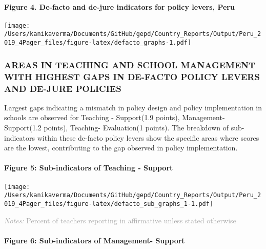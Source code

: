 \documentclass[
  twocolumn]{article}
\begin{document}
\hypertarget{figure-4.-de-facto-and-de-jure-indicators-for-policy-levers-peru}{%
\paragraph{Figure 4. De-facto and de-jure indicators for policy levers,
Peru}\label{figure-4.-de-facto-and-de-jure-indicators-for-policy-levers-peru}}

\texttt{[image: /Users/kanikaverma/Documents/GitHub/gepd/Country\_Reports/Output/Peru\_2019\_4Pager\_files/figure-latex/defacto\_graphs-1.pdf]}

\hypertarget{areas-in-teaching-and-school-management-with-highest-gaps-in-de-facto-policy-levers-and-de-jure-policies}{%
\subsubsection{\texorpdfstring{\textbf{AREAS IN TEACHING AND SCHOOL
MANAGEMENT WITH HIGHEST GAPS IN DE-FACTO POLICY LEVERS AND DE-JURE
POLICIES}}{AREAS IN TEACHING AND SCHOOL MANAGEMENT WITH HIGHEST GAPS IN DE-FACTO POLICY LEVERS AND DE-JURE POLICIES}}\label{areas-in-teaching-and-school-management-with-highest-gaps-in-de-facto-policy-levers-and-de-jure-policies}}

Largest gaps indicating a mismatch in policy design and policy
implementation in schools are observed for Teaching - Support(1.9
points), Management- Support(1.2 points), Teaching- Evaluation(1
points). The breakdown of sub-indicators within these de-facto policy
levers show the specific areas where scores are the lowest, contributing
to the gap observed in policy implementation. \vfill\null

\hypertarget{figure-5-sub-indicators-of-teaching---support}{%
\paragraph{Figure 5: Sub-indicators of Teaching -
Support}\label{figure-5-sub-indicators-of-teaching---support}}

\texttt{[image: /Users/kanikaverma/Documents/GitHub/gepd/Country\_Reports/Output/Peru\_2019\_4Pager\_files/figure-latex/defacto\_sub\_graphs\_1-1.pdf]}

{\scriptsize
    \textcolor{darkgray}{\textit{Notes:} Percent of teachers reporting in affirmative unless stated otherwise}
  }

\hypertarget{figure-6-sub-indicators-of-management--support}{%
\paragraph{Figure 6: Sub-indicators of Management-
Support}\label{figure-6-sub-indicators-of-management--support}}
\end{document}
